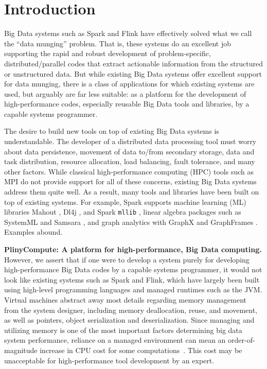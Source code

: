 
\section{Introduction}

Big Data systems such as Spark \cite{zaharia2010spark} and Flink \cite{alexandrov2014stratosphere, carbone2015apache}
have effectively solved what we call the ``data munging'' problem.  That is, 
these systems do an excellent job supporting the rapid
and robust development of problem-specific,
distributed/parallel codes that 
extract actionable information from the structured or unstructured data.
But while existing Big Data systems offer
excellent support for data munging,
there is a class of applications for which 
existing systems are 
used, but arguably are far less suitable:
as a platform 
for the development of high-performance codes, especially reusable
Big Data tools and libraries, by a capable systems programmer.

The desire to build new tools
on top of existing Big Data systems is understandable.  
The  developer of a distributed data processing tool must worry about data persistence, movement of
data to/from secondary storage, data
and task distribution, resource allocation, load balancing, fault tolerance, and many other factors.
While classical high-performance computing (HPC)
tools such as MPI \cite{gropp1996high} do not provide support for all of these concerns,
existing Big Data systems 
address them quite well.
As a result, many tools and libraries have been built on top of existing systems.  For example,
Spark supports
machine learning (ML) libraries Mahout \cite{mahout}, Dl4j \cite{dj4j}, 
and Spark \texttt{mllib} \cite{meng2016mllib}, linear algebra packages such as SystemML \cite{tian2012scalable, boehm2016systemml, ghoting2011systemml, boehm2014hybrid} and Samsara \cite{samsara}, and graph analytics with
GraphX \cite{gonzalez2014graphx} and GraphFrames
\cite{dave2016graphframes}.  Examples abound.

\vspace{5 pt}
\noindent
\textbf{PlinyCompute: A platform for high-performance, Big Data computing.}
However, we assert that if one were to develop a system purely for developing high-performance
Big Data codes
by a capable systems programmer,
it would not look like existing systems such as Spark and Flink,
which have largely 
been built using high-level programming languages and managed runtimes such as the JVM. 
Virtual machines abstract away
most details regarding memory management
from the system designer, including memory deallocation, reuse, and movement, as well as pointers,
object serialization and deserialization.
Since managing and utilizing memory is 
one of the most important factors determining big data system performance, reliance
on a managed environment can mean an order-of-magnitude increase in
CPU cost for some computations~\cite{blackburn2006dacapo}.  
This cost may be unacceptable 
for high-performance tool
development by an expert. 


